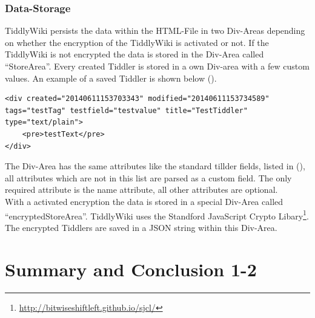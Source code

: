 \documentclass[12pt,a4paper]{article}
\begin{document}
\subsubsection*{Data-Storage}
TiddlyWiki persists the data within the HTML-File in two Div-Areas depending on whether the encryption of the TiddlyWiki is activated or not. If the TiddlyWiki is not encrypted the data is stored in the Div-Area called ``StoreArea''. Every created Tiddler is stored in a own Div-area with a few custom values. An example of a saved Tiddler is shown below (). 
\begin{lstlisting}[caption={Data-Div},label=lst:data-div]
<div created="20140611153703343" modified="20140611153734589" tags="testTag" testfield="testvalue" title="TestTiddler" type="text/plain">
	<pre>testText</pre>
</div>
\end{lstlisting}
The Div-Area has the same attributes like the standard tillder fields, listed in  (), all attributes which are not in this list are parsed as a custom field. The only required attribute is the name attribute, all other attributes are optional.\\
With a activated encryption the data is stored in a special Div-Area called ``encryptedStoreArea''. TiddlyWiki uses the Standford JavaScript Crypto Libary\footnote{\url{http://bitwiseshiftleft.github.io/sjcl/}}. The encrypted Tiddlers are saved in a JSON string within this Div-Area.
\newpage
\section{Summary and Conclusion 1-2}


\end{document}
